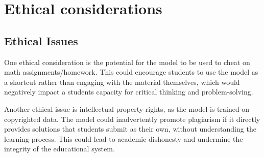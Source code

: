 \documentclass{article}
\begin{document}





\section{Ethical considerations}



\subsection{Ethical Issues}
One ethical consideration is the potential for the model to be used to cheat on math assignments/homework. This could encourage students to use the model as a shortcut rather than engaging with the material themselves, which would negatively impact a students capacity for critical thinking and problem-solving. 

Another ethical issue is intellectual property rights, as the model is trained on copyrighted data. The model could inadvertently promote plagiarism if it directly provides solutions that students submit as their own, without understanding the learning process. This could lead to academic dishonesty and undermine the integrity of the educational system.
\end{document}
